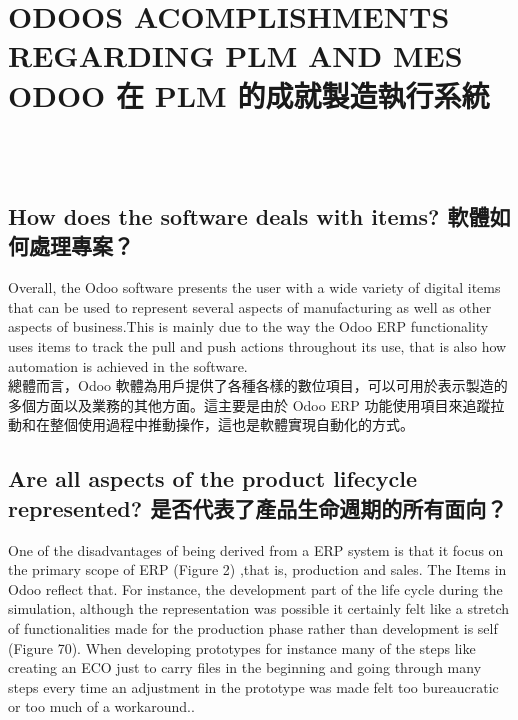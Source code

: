 \chapter{ODOOS ACOMPLISHMENTS REGARDING PLM AND MES ODOO 在 PLM 的成就製造執行系統} 
\setcounter{page}{1}  %

\fontsize{12}{2.5pt}\selectfont {This chapter aims to summarize the strengths and weaknesses of the Odoo software focusing on the questions raised on section 4.2. It will also comment Odoo functionalities or lack thereof noticed throughout the simulation also taking the questions into account.}\\[1pt]

\fontsize{12}{2.5pt}\selectfont {本章旨在總結 Odoo 軟體的優點和缺點重點關注4.2節提出的問題。 它還會評論 Odoo 功能或考慮到問題，整個模擬過程中也注意到缺乏這一點。}\\[15pt]

\section{How does the software deals with items? 軟體如何處理專案？}
\fontsize{12pt}{2.5pt}\selectfont
{Overall, the Odoo software presents the user with a wide variety of digital items that can be used to represent several aspects of
manufacturing as well as other aspects of business.This is mainly due to the way the Odoo ERP functionality uses items to track the pull and push actions throughout its use, that is also how automation is achieved in the software.}\\[1pt]

\fontsize{12pt}{2.5pt}\selectfont 
{總體而言，Odoo 軟體為用戶提供了各種各樣的數位項目，可以可用於表示製造的多個方面以及業務的其他方面。這主要是由於 Odoo ERP 功能使用項目來追蹤拉動和在整個使用過程中推動操作，這也是軟體實現自動化的方式。}\\[1pt]

\section{Are all aspects of the product lifecycle represented? 是否代表了產品生命週期的所有面向？}
\fontsize{12pt}{2.5pt}\selectfont 
{One of the disadvantages of being derived from a ERP system is that it focus on the primary scope of ERP (Figure 2) ,that is,
production and sales. The Items in Odoo reflect that. For instance, the development part of the life cycle during the simulation, although the representation was possible it certainly felt like a stretch of functionalities made for the production phase rather than development is self (Figure 70). When developing prototypes for instance many of the steps like creating an ECO just to carry files in the beginning and going through many steps every time an adjustment in the prototype was made felt too bureaucratic or too much of a workaround..}\\[1pt]

